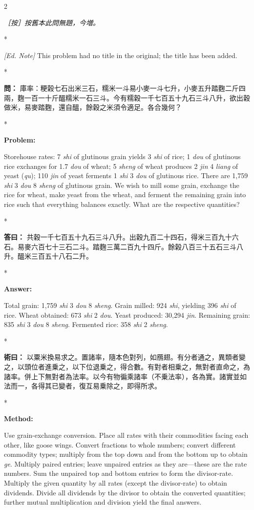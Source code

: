 \documentclass[11pt,a4paper]{article}
\newcommand{\CnQuestion}[1]{\par\noindent\textbf{\color{problemcolor}問：}#1\par\vspace{0.5ex}}
\newcommand{\CnAnswer}[1]{\par\noindent\textbf{\color{answercolor}答曰：}#1\par\vspace{0.5ex}}
\newcommand{\CnMethod}[1]{\par\noindent\textbf{\color{methodcolor}術曰：}#1\par\vspace{0.5ex}}
\newcommand{\CnEditorial}[1]{\par\noindent\textcolor{editorialcolor}{\textit{［按］#1}}\par\vspace{0.5ex}}
\newcommand{\EnQuestion}{\par\noindent\textbf{\color{problemcolor}Problem:}\par\vspace{0.5ex}}
\newcommand{\EnAnswer}{\par\noindent\textbf{\color{answercolor}Answer:}\par\vspace{0.5ex}}
\newcommand{\EnMethod}{\par\noindent\textbf{\color{methodcolor}Method:}\par\vspace{0.5ex}}
\newcommand{\EnEditorial}{\par\noindent\textcolor{editorialcolor}{\textit{[Ed. Note] }}\ignorespaces}
\newcommand{\switchCn}{\switchcolumn[0]*}
\newcommand{\switchEn}{\switchcolumn[1]*}
\begin{document}
\begin{paracol}{2}

\CnEditorial{按舊本此問無題，今増。}

\switchEn

\EnEditorial This problem had no title in the original; the title has been added.

\switchCn

\CnQuestion{%
庫率：粳榖七石出米三石，糯米一斗易小麥一斗七升，小麥五升踏麴二斤四兩，麴一百一十斤醞糯米一石三斗。今有糯穀一千七百五十九石三斗八升，欲出穀做米，易麥踏麴，還自醞，餘穀之米須令適足。各合幾何？
}

\switchEn

\EnQuestion
Storehouse rates: 7 \textit{shi} of glutinous grain yields 3 \textit{shi} of rice; 1 \textit{dou} of glutinous rice exchanges for 1.7 \textit{dou} of wheat; 5 \textit{sheng} of wheat produces 2 \textit{jin} 4 \textit{liang} of yeast (\textit{qu}); 110 \textit{jin} of yeast ferments 1 \textit{shi} 3 \textit{dou} of glutinous rice. There are 1,759 \textit{shi} 3 \textit{dou} 8 \textit{sheng} of glutinous grain. We wish to mill some grain, exchange the rice for wheat, make yeast from the wheat, and ferment the remaining grain into rice such that everything balances exactly. What are the respective quantities?

\switchCn

\CnAnswer{%
共穀一千七百五十九石三斗八升。出穀九百二十四石，得米三百九十六石。易麥六百七十三石二斗。踏麴三萬二百九十四斤。餘榖八百三十五石三斗八升。醞米三百五十八石二升。
}

\switchEn

\EnAnswer
Total grain: 1,759 \textit{shi} 3 \textit{dou} 8 \textit{sheng}. Grain milled: 924 \textit{shi}, yielding 396 \textit{shi} of rice. Wheat obtained: 673 \textit{shi} 2 \textit{dou}. Yeast produced: 30,294 \textit{jin}. Remaining grain: 835 \textit{shi} 3 \textit{dou} 8 \textit{sheng}. Fermented rice: 358 \textit{shi} 2 \textit{sheng}.

\switchCn

\CnMethod{%
以粟米換易求之。置諸率，隨本色對列，如鴈翅。有分者通之，異類者變之，以頭位者進乗之，以下位退乗之，得合數。有對者相乗之，無對者直命之，為諸率。併上下無對者為法率。以今有物徧乘諸率（不乗法率），各為實。諸實並如法而一，各得其已變者，復互易乗除之，即得所求。
}

\switchEn

\EnMethod
Use grain-exchange conversion. Place all rates with their commodities facing each other, like goose wings. Convert fractions to whole numbers; convert different commodity types; multiply from the top down and from the bottom up to obtain \textit{ge}. Multiply paired entries; leave unpaired entries as they are---these are the rate numbers. Sum the unpaired top and bottom entries to form the divisor-rate. Multiply the given quantity by all rates (except the divisor-rate) to obtain dividends. Divide all dividends by the divisor to obtain the converted quantities; further mutual multiplication and division yield the final answers.

\end{paracol}
\end{document}
